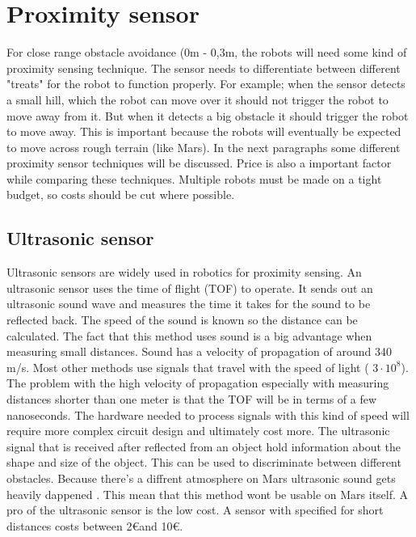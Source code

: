 \documentclass[10pt,a4paper]{article}
\begin{document}
\newpage

\section{Proximity sensor}
For close range obstacle avoidance (0m - 0,3m, the robots will need some kind of proximity sensing technique. The sensor needs to differentiate between different "treats" for the robot to function properly. For example; when the sensor detects a small hill, which the robot can move over it should not trigger the robot to move away from it. But when it detects a big obstacle it should trigger the robot to move away. This is important because the robots will eventually be expected to move across rough terrain (like Mars). In the next paragraphs some different proximity sensor techniques will be discussed. Price is also a important factor while comparing these techniques. Multiple robots must be made on a tight budget, so costs should be cut where possible.\\

\subsection{Ultrasonic sensor}
Ultrasonic sensors are widely used in robotics for proximity sensing. An ultrasonic sensor uses the time of flight (TOF) to operate. It sends out an ultrasonic sound wave and measures the time it takes for the sound to be reflected back. The speed of the sound is known so the distance can be calculated. The fact that this method uses sound is a big advantage when measuring small distances. Sound has a velocity of propagation of around 340 m/s. Most other methods use signals that travel with the speed of light ( $3\cdot10^{8}$). The problem with the high velocity of  propagation especially with measuring distances shorter than one meter is that the TOF will be in terms of a few nanoseconds.  The hardware needed to process signals with this kind of speed will require more complex circuit design and ultimately cost more. The ultrasonic signal that is received after reflected from an object hold information about the shape and size of the object. This can be used to discriminate between different obstacles\cite{ultraobject}. Because there's a diffrent atmosphere on Mars ultrasonic sound gets heavily dappened \cite{soundonmars}. This mean that this method wont be usable on Mars itself. A pro of the ultrasonic sensor is the low cost. A sensor with specified for short distances costs between 2\euro and 10\euro.
\end{document}
